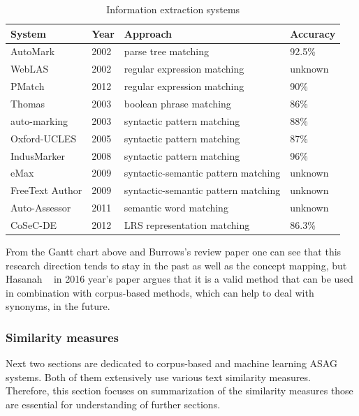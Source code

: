 \begin{table}[h!]
\centering
\caption{Information extraction systems}
\label{IE}
\begin{tabular}{|l|l|l|l|}
\hline
 System & Year & Approach & Accuracy \\ \hline
 AutoMark & 2002  & parse tree matching & 92.5\% \\ \hline
 WebLAS & 2002  & regular expression matching  & unknown \\ \hline
 PMatch & 2012  & regular expression matching & 90\%  \\ \hline
 Thomas & 2003  & boolean phrase matching & 86\% \\ \hline
 auto-marking & 2003  & syntactic pattern matching &  88\% \\ \hline
 Oxford-UCLES & 2005  & syntactic pattern matching &  87\% \\ \hline
 IndusMarker & 2008  & syntactic pattern matching & 96\% \\ \hline
 eMax & 2009  & syntactic-semantic pattern matching &  unknown \\ \hline
 FreeText Author & 2009  & syntactic-semantic pattern matching &  unknown \\ \hline
 Auto-Assessor & 2011  & semantic word matching  &  unknown \\ \hline
 CoSeC-DE & 2012 & LRS representation matching &  86.3\% \\ \hline
\end{tabular}
\end{table}

From the Gantt chart above and Burrows's review paper one can see that this research direction tends to stay in the past as well as the concept mapping, but Hasanah ~\cite{Hasanah} in 2016 year's paper argues that it is a valid method that can be used in combination with corpus-based methods, which can help to deal with synonyms, in the future.

\subsubsection{Similarity measures}

Next two sections are dedicated to corpus-based and machine learning ASAG systems. Both of them extensively use various text similarity measures. Therefore, this section focuses on summarization of the similarity measures those are essential for understanding of further sections.\\

